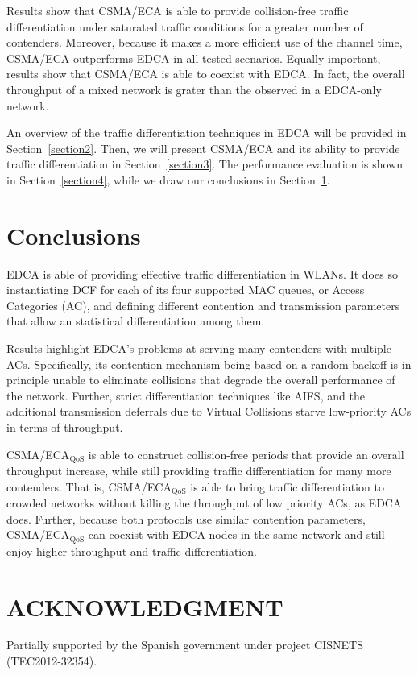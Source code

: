 \documentclass[a4paper,journal]{IEEEtran}
\begin{document}
Results show that CSMA/ECA is able to provide collision-free traffic differentiation under saturated traffic conditions for a greater number of contenders. Moreover, because it makes a more efficient use of the channel time, CSMA/ECA outperforms EDCA in all tested scenarios. Equally important, results show that CSMA/ECA is able to coexist with EDCA. In fact, the overall throughput of a mixed network is grater than the observed in a EDCA-only network.

An overview of the traffic differentiation techniques in EDCA will be provided in Section~\ref{section2}. Then, we will present CSMA/ECA and its ability to provide traffic differentiation in Section~\ref{section3}. The performance evaluation is shown in Section~\ref{section4}, while we draw our conclusions in Section~\ref{section5}.





\section{Conclusions}\label{section5}
EDCA is able of providing effective traffic differentiation in WLANs. It does so instantiating DCF for each of its four supported MAC queues, or Access Categories (AC), and defining different contention and transmission parameters that allow an statistical differentiation among them. 

Results highlight EDCA's problems at serving many contenders with multiple ACs. Specifically, its contention mechanism being based on a random backoff is in principle unable to eliminate collisions that degrade the overall performance of the network. Further, strict differentiation techniques like AIFS, and the additional transmission deferrals due to Virtual Collisions starve low-priority ACs in terms of throughput.

CSMA/ECA$_{\text{QoS}}$ is able to construct collision-free periods that provide an overall throughput increase, while still providing traffic differentiation for many more contenders. That is, CSMA/ECA$_{\text{QoS}}$ is able to bring traffic differentiation to crowded networks without killing the throughput of low priority ACs, as EDCA does. Further, because both protocols use similar contention parameters, CSMA/ECA$_{\text{QoS}}$ can coexist with EDCA nodes in the same network and still enjoy higher throughput and traffic differentiation.

\section*{ACKNOWLEDGMENT}
Partially supported by the Spanish government under project CISNETS (TEC2012-32354).



\end{document}
